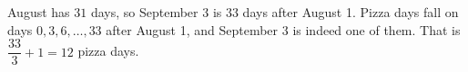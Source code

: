 August has $31$ days, so September 3 is $33$ days after August 1. Pizza days fall on days $0,3,6,\dots,33$ after August 1, and September 3 is indeed one of them. That is $\dfrac{33}{3}+1=\boxed{12}$ pizza days.
